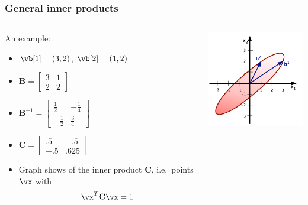 \begin{frame}
  \frametitle{General inner products} 
  
  \begin{columns}[T]
    \begin{column}{50mm}
      An example:
      \begin{itemize}\gap
      \item $\vb[1] = (3,2)$, $\vb[2] = (1,2)$
      \item \(
        \mathbf{B} = \begin{bmatrix}
          3 & 1 \\ 2 & 2
        \end{bmatrix} \)
      \item \(
        \mathbf{B}^{-1} = \begin{bmatrix}
          \frac12 & -\frac14 \\ -\frac12 & \frac34
        \end{bmatrix} \)
      \item \(
        \mathbf{C} = \begin{bmatrix}
          .5 & -.5 \\ -.5 & .625
        \end{bmatrix} \)
      \item Graph shows  of the inner product $\mathbf{C}$, i.e.\
        points $\vx$ with \[ \vx^T \mathbf{C} \vx = 1 \]
      \end{itemize}
    \end{column}
    \begin{column}{50mm}
      \includegraphics[width=50mm]{img/2_inner_product_1}
    \end{column}
  \end{columns}
\end{frame}

